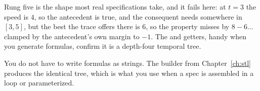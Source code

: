 Rung five is the shape most real specifications take, and it fails here: at $t=3$ the speed is $4$, so the antecedent  is true, and the consequent needs  somewhere in $[3, 5]$, but the best the trace offers there is $6$, so the property misses by $8 - 6$... clamped by the antecedent's own margin to $-1$. The  and  getters, handy when you generate formulas, confirm it is a depth-four temporal tree.

\begin{notebox}
You do not have to write formulas as strings. The builder from Chapter~\ref{ch:stl} produces the identical tree, which is what you use when a spec is assembled in a loop or parameterized.
\end{notebox}